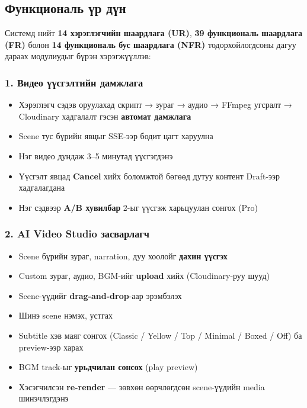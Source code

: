 \subsection{Функциональ үр дүн}

Системд нийт \textbf{14 хэрэглэгчийн шаардлага (UR)}, \textbf{39 функциональ шаардлага (FR)} болон \textbf{14 функциональ бус шаардлага (NFR)} тодорхойлогдсоны дагуу дараах модулиудыг бүрэн хэрэгжүүллэв:

\subsubsection*{1. Видео үүсгэлтийн дамжлага}
\begin{itemize}
  \item Хэрэглэгч сэдэв оруулахад скрипт → зураг → аудио → FFmpeg угсралт → Cloudinary хадгалалт гэсэн \textbf{автомат дамжлага}
  \item Scene тус бүрийн явцыг SSE-ээр бодит цагт харуулна
  \item Нэг видео дундаж 3--5 минутад үүсгэгдэнэ
  \item Үүсгэлт явцад \textbf{Cancel} хийх боломжтой бөгөөд дутуу контент Draft-ээр хадгалагдана
  \item Нэг сэдвээр \textbf{A/B хувилбар} 2-ыг үүсгэж харьцуулан сонгох (Pro)
\end{itemize}

\subsubsection*{2. AI Video Studio засварлагч}
\begin{itemize}
  \item Scene бүрийн зураг, narration, дуу хоолойг \textbf{дахин үүсгэх}
  \item Custom зураг, аудио, BGM-ийг \textbf{upload} хийх (Cloudinary-руу шууд)
  \item Scene-үүдийг \textbf{drag-and-drop}-аар эрэмбэлэх
  \item Шинэ scene нэмэх, устгах
  \item Subtitle хэв маяг сонгох (Classic / Yellow / Top / Minimal / Boxed / Off) ба preview-ээр харах
  \item BGM track-ыг \textbf{урьдчилан сонсох} (play preview)
  \item Хэсэгчилсэн \textbf{re-render} --- зөвхөн өөрчлөгдсөн scene-үүдийн media шинэчлэгдэнэ
\end{itemize}

